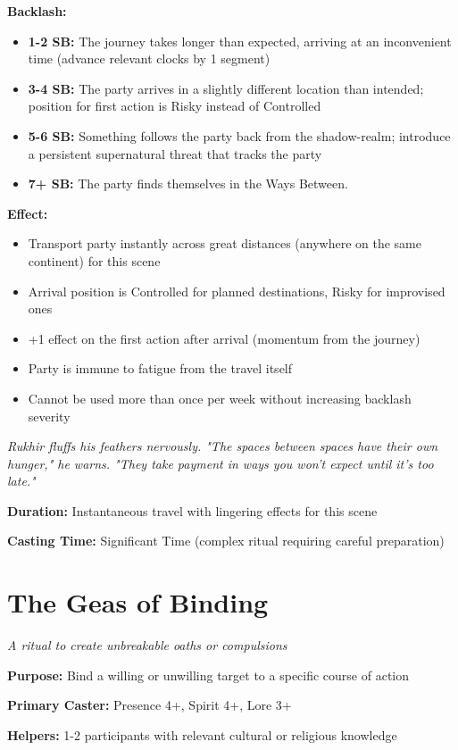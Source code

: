 \documentclass[12pt,twoside]{book}
\newcommand{\shadow}[1]{\textit{#1}}
\begin{document}
\textbf{Backlash:}
\begin{itemize}
\item \textbf{1-2 SB:} The journey takes longer than expected, arriving at an inconvenient time (advance relevant clocks by 1 segment)
\item \textbf{3-4 SB:} The party arrives in a slightly different location than intended; position for first action is Risky instead of Controlled
\item \textbf{5-6 SB:} Something follows the party back from the shadow-realm; introduce a persistent supernatural threat that tracks the party
\item \textbf{7+ SB:} The party finds themselves in the Ways Between.
\end{itemize}

\textbf{Effect:}
\begin{itemize}
\item Transport party instantly across great distances (anywhere on the same continent) for this scene
\item Arrival position is Controlled for planned destinations, Risky for improvised ones
\item +1 effect on the first action after arrival (momentum from the journey)
\item Party is immune to fatigue from the travel itself
\item Cannot be used more than once per week without increasing backlash severity
\end{itemize}

\shadow{Rukhir fluffs his feathers nervously. "The spaces between spaces have their own hunger," he warns. "They take payment in ways you won't expect until it's too late."}

\textbf{Duration:} Instantaneous travel with lingering effects for this scene

\textbf{Casting Time:} Significant Time (complex ritual requiring careful preparation)

\section*{The Geas of Binding}
\textit{A ritual to create unbreakable oaths or compulsions}

\textbf{Purpose:} Bind a willing or unwilling target to a specific course of action

\textbf{Primary Caster:} Presence 4+, Spirit 4+, Lore 3+

\textbf{Helpers:} 1-2 participants with relevant cultural or religious knowledge
\end{document}
